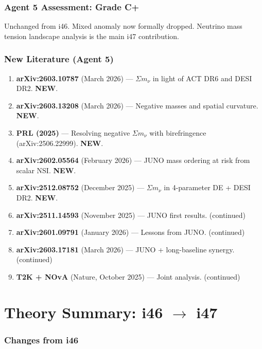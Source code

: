 \documentclass[11pt,a4paper]{article}
\newcommand{\NEW}{\textcolor{dfdblue}{\textbf{NEW}}}
\begin{document}
\section{Agent 5 Assessment: Grade C+}

Unchanged from i46. Mixed anomaly now formally dropped. Neutrino mass tension landscape analysis is the main i47 contribution.

\section{New Literature (Agent 5)}

\begin{enumerate}
\item \textbf{arXiv:2603.10787} (March 2026) --- $\Sigma m_\nu$ in light of ACT DR6 and DESI DR2. \NEW.
\item \textbf{arXiv:2603.13208} (March 2026) --- Negative masses and spatial curvature. \NEW.
\item \textbf{PRL (2025)} --- Resolving negative $\Sigma m_\nu$ with birefringence (arXiv:2506.22999). \NEW.
\item \textbf{arXiv:2602.05564} (February 2026) --- JUNO mass ordering at risk from scalar NSI. \NEW.
\item \textbf{arXiv:2512.08752} (December 2025) --- $\Sigma m_\nu$ in 4-parameter DE + DESI DR2. \NEW.
\item \textbf{arXiv:2511.14593} (November 2025) --- JUNO first results. (continued)
\item \textbf{arXiv:2601.09791} (January 2026) --- Lessons from JUNO. (continued)
\item \textbf{arXiv:2603.17181} (March 2026) --- JUNO + long-baseline synergy. (continued)
\item \textbf{T2K + NOvA} (Nature, October 2025) --- Joint analysis. (continued)
\end{enumerate}


\part{Theory Summary: i46 $\to$ i47}

\section{Changes from i46}
\end{document}
